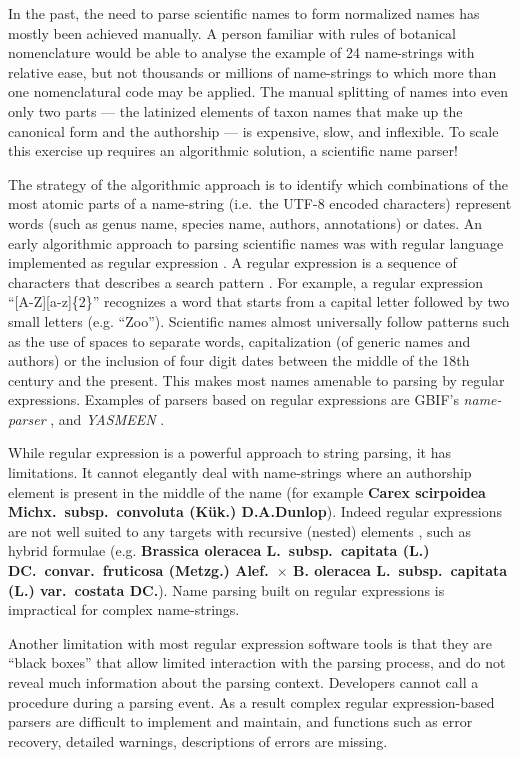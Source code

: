 \documentclass{bmcart}
\begin{document}
In the past, the need to parse scientific names to form normalized names has mostly been achieved manually. A person familiar with rules of botanical nomenclature would be able to analyse the example of 24 name-strings with relative ease, but not thousands or millions of name-strings to which more than one nomenclatural code may be applied. The manual splitting of names into even only two parts --- the latinized elements of taxon names that make up the canonical form and the authorship --- is expensive, slow, and inflexible. To scale this exercise up requires an algorithmic solution, a scientific name parser!

The strategy of the algorithmic approach is to identify which combinations of the most atomic parts of a name-string (i.e.\ the UTF-8 encoded characters) represent words (such as genus name, species name, authors, annotations) or dates. An early algorithmic approach to parsing scientific names was with regular language implemented as regular expression \cite{Leary2007}. A regular expression is a sequence of characters that describes a search pattern \cite{aho1992foundations}. For example, a regular expression ``[A-Z][a-z]\{2\}'' recognizes a word that starts from a capital letter followed by two small letters (e.g. ``Zoo''). Scientific names almost universally follow patterns such as the use of spaces to separate words, capitalization (of generic names and authors) or the inclusion of four digit dates between the middle of the 18th century and the present. This makes most names amenable to parsing by regular expressions.  Examples of parsers based on regular expressions are GBIF's \textit{name-parser} \cite{gbifNameParser}, and \textit{YASMEEN} \cite{VandenBerghe2015}.

While regular expression is a powerful approach to string parsing, it has limitations. It cannot elegantly deal with name-strings where an authorship element is present in the middle of the name (for example \textbf{Carex scirpoidea Michx.\ subsp.\ convoluta (Kük.) D.A.Dunlop}). Indeed regular expressions are not well suited to any targets with recursive (nested) elements \cite{yu1997handbook}, such as hybrid formulae (e.g. \textbf{Brassica oleracea L.\ subsp.\ capitata (L.) DC.\ convar.\ fruticosa (Metzg.) Alef.\ $\times$ B.  oleracea L.\ subsp.\ capitata (L.) var.\ costata DC.}). Name parsing built on regular expressions is impractical for complex name-strings.

Another limitation with most regular expression software tools is that they are ``black boxes'' that allow limited interaction with the parsing process, and do not reveal much information about the parsing context. Developers cannot call a procedure during a parsing event. As a result complex regular expression-based parsers are difficult to implement and maintain, and functions such as error recovery, detailed warnings, descriptions of errors are missing.
\end{document}
